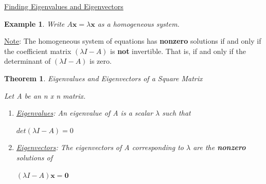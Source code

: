 \documentclass[12pt]{article}
\newtheorem{thm}{Theorem}
\newtheorem{ex}{Example}
\newcommand{\tbf}{\textbf}
\begin{document}
\pagebreak
\begin{center}
\underline{Finding Eigenvalues and Eigenvectors}
\end{center}

\begin{ex}
Write $A\tbf{x} = \lambda \tbf{x}$ as a homogeneous system.
\end{ex}
\vfill

\underline{Note}: The homogeneous system of equations has \tbf{nonzero} solutions if and only if the coefficient matrix $(\lambda I - A)$ is \tbf{not} invertible. That is,  if and only if the determinant of $(\lambda I - A)$ is zero.


\vspace{.1in}

\begin{thm} Eigenvalues and Eigenvectors of a Square Matrix

Let A be an n x n matrix.

\begin{enumerate}
\item
\underline{Eigenvalues}: An eigenvalue of A is a scalar $\lambda$ such that 
\begin{center}
$det(\lambda I - A) = 0$
\end{center}


\item
\underline{Eigenvectors}: The eigenvectors of A corresponding to $\lambda$ are the \tbf{nonzero} solutions of  
\begin{center}
$(\lambda I - A)\tbf{x} = \tbf{0}$
\end{center}

\end{enumerate}

\end{thm}

\vspace{.1in}
\end{document}

